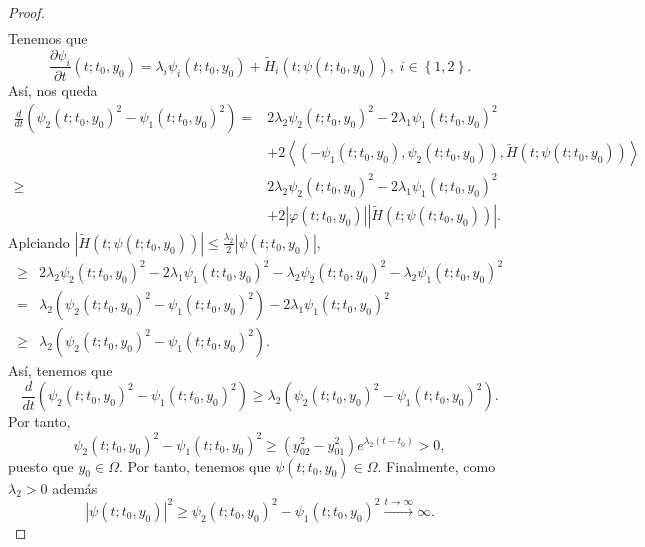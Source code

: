 \begin{proof}
\[\begin{split}
	\end{split}
	\]
	Tenemos que 
	\[\frac{\partial \psi_{i}}{\partial t}\left(t; t_{0}, y_{0}\right)=\lambda_{i}\psi_{i}\left(t; t_{0}, y_{0}\right) + \tilde{H}_{i}\left(t; \psi\left(t; t_{0}, y_{0}\right)\right), \; i \in \left\{ 1, 2\right\}  .\]
	Así, nos queda
	\[
	\begin{split}
		\frac{d}{dt}\left(\psi_{2}\left(t; t_{0}, y_{0}\right)^{2}-\psi_{1}\left(t; t_{0}, y_{0}\right)^{2}\right) = & 2 \lambda_{2}\psi_{2}\left(t; t_{0}, y_{0}\right)^{2}-2\lambda_{1}\psi_{1}\left(t; t_{0}, y_{0}\right)^{2} \\
															     & + 2 \left\langle \left(-\psi_{1}\left(t; t_{0}, y_{0}\right), \psi_{2}\left(t; t_{0}, y_{0}\right)\right), \tilde{H}\left(t; \psi\left(t; t_{0}, y_{0}\right)\right) \right\rangle \\
		\geq & 2 \lambda_{2}\psi_{2}\left(t; t_{0}, y_{0}\right)^{2} - 2\lambda_{1}\psi_{1}\left(t; t_{0}, y_{0}\right)^{2} \\
		     & + 2 \left|\varphi\left(t; t_{0}, y_{0}\right)\right| \left|\tilde{H}\left(t; \psi\left(t; t_{0}, y_{0}\right)\right)\right|.
	\end{split}
	\]
	Aplciando $\displaystyle \left|\tilde{H}\left(t; \psi\left(t; t_{0}, y_{0}\right)\right)\right| \leq \frac{\lambda _{2}}{2} \left|\psi\left(t; t_{0}, y_{0}\right)\right| $,
	\[
	\begin{split}
		\geq & 2\lambda_{2}\psi_{2}\left(t; t_{0}, y_{0}\right)^{2} - 2\lambda_{1}\psi_{1}\left(t; t_{0}, y_{0}\right)^{2} -\lambda_{2}\psi_{2}\left(t; t_{0}, y_{0}\right)^{2}-\lambda_{2}\psi_{1}\left(t; t_{0}, y_{0}\right)^{2} \\
		= & \lambda_{2}\left(\psi_{2}\left(t; t_{0}, y_{0}\right)^{2}-\psi_{1}\left(t; t_{0}, y_{0}\right)^{2}\right)-2\lambda_{1}\psi_{1}\left(t; t_{0}, y_{0}\right)^{2} \\
		\geq & \lambda_{2} \left(\psi_{2}\left(t; t_{0}, y_{0}\right)^{2} -\psi_{1}\left(t; t_{0}, y_{0}\right)^{2}\right).
	\end{split}
	\]
Así, tenemos que 
\[\frac{d}{dt}\left(\psi_{2}\left(t; t_{0}, y_{0}\right)^{2}-\psi_{1}\left(t; t_{0}, y_{0}\right)^{2}\right) \geq \lambda_{2}\left(\psi_{2}\left(t; t_{0}, y_{0}\right)^{2} -\psi_{1}\left(t; t_{0}, y_{0}\right)^{2}\right) .\]
Por tanto, 
\[\psi_{2}\left(t; t_{0}, y_{0}\right)^{2}-\psi_{1}\left(t; t_{0}, y_{0}\right)^{2} \geq \left(y_{02}^{2}-y_{01}^{2}\right)e^{\lambda_{2}\left(t-t_{0}\right)} > 0,\]
puesto que $\displaystyle y_{0} \in \Omega  $. Por tanto, tenemos que $\displaystyle \psi\left(t; t_{0}, y_{0}\right)\in \Omega  $. Finalmente, como $\displaystyle \lambda_{2} > 0 $ además
\[ \left|\psi\left(t; t_{0}, y_{0}\right)\right|^{2} \geq \psi_{2}\left(t; t_{0} , y_{0}\right)^{2} -\psi_{1}\left(t; t_{0}, y_{0}\right)^{2}\xrightarrow{t \to \infty} \infty .\]
\end{proof}
